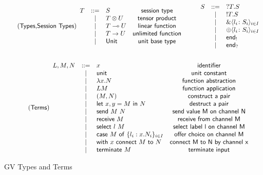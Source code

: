 \begin{figure*}
\begin{gather*}
  \tag{\key{Types},\key{Session Types}}
  \begin{array}{rclc}
    T & \bnf & S & \key{session type}\\
      & \alt & \tensor{T}{U} & \key{tensor product}\\
      & \alt & \lfn{T}{U} & \key{linear function}\\
      & \alt & \fn{T}{U} & \key{unlimited function}\\
      & \alt & \key{Unit} & \key{unit base type}
  \end{array}
  \qquad
  \begin{array}{rcl}
    S & \bnf & \inpt{T}{S}\\
      & \alt & \outpt{T}{S}\\
      & \alt & \Branch{l_i}{S_i}{i\in I}\\
      & \alt & \Choice{l_i}{S_i}{i\in I}\\
      & \alt & \outend\\
      & \alt & \inend
  \end{array}
  \\ \\
  \tag{\key{Terms}}
  \begin{array}{rclc}
    L,M,N & \bnf & x                    & \key{identifier}\\
          & \alt & \key{unit}           & \key{unit constant}\\
          & \alt & \abs{x}{N}           & \key{function abstraction}\\
          & \alt & LM                   & \key{function application}\\
          & \alt & \pair{M}{N}          & \key{construct a pair}\\
          & \alt & \Letpair{x}{y}{M}{N} & \key{destruct a pair}\\
          & \alt & \send{M}{N}          & \key{send value M on channel N}\\
          & \alt & \receive{M}          & \key{receive from channel M}\\
          & \alt & \select{l}{M}        & \key{select label l on channel M}\\
          & \alt & \cse{M}{\set{l_i:x.N_i}_{i \in I}}
                                        & \key{offer choice on channel M}\\
          & \alt & \key{with}~x~\key{connect}~M~\key{to}~N
                                        & \key{connect M to N by channel x}\\
          & \alt & \key{terminate}~M    & \key{terminate input}
  \end{array}
\end{gather*}
\caption{GV Types and Terms}
\label{fig:gvtnts}
\end{figure*}
